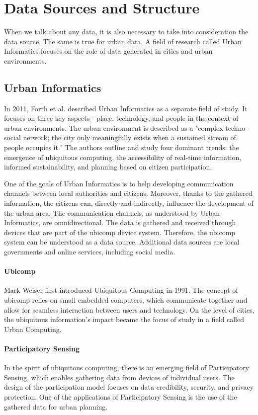 \section{Data Sources and Structure}
When we talk about any data, it is also necessary to take into consideration the data source. The same is true for urban data. A field of research called Urban Informatics focuses on the role of data generated in cities and urban environments.

\subsection{Urban Informatics}
In 2011, Forth et al. described Urban Informatics as a separate field of study. It focuses on three key aspects - place, technology, and people in the context of urban environments. The urban environment is described as a "complex techno-social network; the city only meaningfully exists when a sustained stream of people occupies it." The authors outline and study four dominant trends: the emergence of ubiquitous computing, the accessibility of real-time information, informed sustainability, and planning based on citizen participation. 

One of the goals of Urban Informatics is to help developing communication channels between local authorities and citizens. Moreover, thanks to the gathered information, the citizens can, directly and indirectly, influence the development of the urban area. The communication channels, as understood by Urban Informatics, are omnidirectional. The data is gathered and received through devices that are part of the ubicomp device system. Therefore, the ubicomp system can be understood as a data source. Additional data sources are local governments and online services, including social media. 

\paragraph{Ubicomp} Mark Weiser first introduced Ubiquitous Computing in 1991. The concept of ubicomp relies on small embedded computers, which communicate together and allow for seamless interaction between users and technology. On the level of cities, the ubiquitous information's impact became the focus of study in a field called Urban Computing. 

\paragraph{Participatory Sensing} In the spirit of ubiquitous computing, there is an emerging field of Participatory Sensing, which enables gathering data from devices of individual users. The design of the participation model focuses on data credibility, security, and privacy protection. One of the applications of Participatory Sensing is the use of the gathered data for urban planning. 

